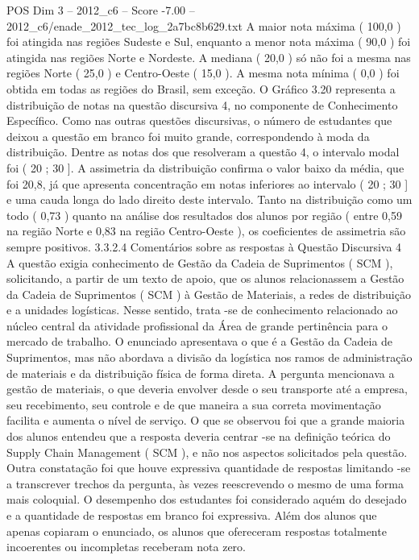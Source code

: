 \begin{textsample}{POS Dim 3 – 2012\_c6 – Score -7.00 – 2012\_c6/enade\_2012\_tec\_log\_2a7bc8b629.txt}
A maior nota máxima ( 100,0 ) foi atingida nas regiões Sudeste e Sul, enquanto a menor nota máxima ( 90,0 ) foi atingida nas regiões Norte e Nordeste.
A mediana ( 20,0 ) só não foi a mesma nas regiões Norte ( 25,0 ) e Centro-Oeste ( 15,0 ).
A mesma nota mínima ( 0,0 ) foi obtida em todas as regiões do Brasil, sem exceção.
O Gráfico 3.20 representa a distribuição de notas na questão discursiva 4, no componente de Conhecimento Específico.
Como nas outras questões discursivas, o número de estudantes que deixou a questão em branco foi muito grande, correspondendo à moda da distribuição.
Dentre as notas dos que resolveram a questão 4, o intervalo modal foi ( 20 ; 30 ].
A assimetria da distribuição confirma o valor baixo da média, que foi 20,8, já que apresenta concentração em notas inferiores ao intervalo ( 20 ; 30 ] e uma cauda longa do lado direito deste intervalo.
Tanto na distribuição como um todo ( 0,73 ) quanto na análise dos resultados dos alunos por região ( entre 0,59 na região Norte e 0,83 na região Centro-Oeste ), os coeficientes de assimetria são sempre positivos. 3.3.2.4 Comentários sobre as respostas à Questão Discursiva 4 A questão exigia conhecimento de Gestão da Cadeia de Suprimentos ( SCM ), solicitando, a partir de um texto de apoio, que os alunos relacionassem a Gestão da Cadeia de Suprimentos ( SCM ) à Gestão de Materiais, a redes de distribuição e a unidades logísticas.
Nesse sentido, trata -se de conhecimento relacionado ao núcleo central da atividade profissional da Área de grande pertinência para o mercado de trabalho.
O enunciado apresentava o que é a Gestão da Cadeia de Suprimentos, mas não abordava a divisão da logística nos ramos de administração de materiais e da distribuição física de forma direta.
A pergunta mencionava a gestão de materiais, o que deveria envolver desde o seu transporte até a empresa, seu recebimento, seu controle e de que maneira a sua correta movimentação facilita e aumenta o nível de serviço.
O que se observou foi que a grande maioria dos alunos entendeu que a resposta deveria centrar -se na definição teórica do Supply Chain Management ( SCM ), e não nos aspectos solicitados pela questão.
Outra constatação foi que houve expressiva quantidade de respostas limitando -se a transcrever trechos da pergunta, às vezes reescrevendo o mesmo de uma forma mais coloquial.
O desempenho dos estudantes foi considerado aquém do desejado e a quantidade de respostas em branco foi expressiva.
Além dos alunos que apenas copiaram o enunciado, os alunos que ofereceram respostas totalmente incoerentes ou incompletas receberam nota zero.

\end{textsample}
